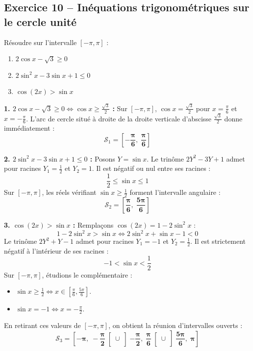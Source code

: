 \documentclass[11pt,a4paper]{article}
\begin{document}
\vspace{0.3cm}

\subsection*{Exercice 10 -- Inéquations trigonométriques sur le cercle unité}

Résoudre sur l'intervalle $[-\pi, \pi]$ :
\begin{enumerate}[label=\arabic*.]
    \item $2\cos x - \sqrt{3} \ge 0$
    \item $2\sin^2 x - 3\sin x + 1 \le 0$
    \item $\cos(2x) > \sin x$
\end{enumerate}

\begin{correctionbox}
\textbf{1. $2\cos x - \sqrt{3} \ge 0 \iff \cos x \ge \frac{\sqrt{3}}{2}$ :}
Sur $[-\pi, \pi]$, $\cos x = \frac{\sqrt{3}}{2}$ pour $x = \frac{\pi}{6}$ et $x = -\frac{\pi}{6}$.
L'arc de cercle situé à droite de la droite verticale d'abscisse $\frac{\sqrt{3}}{2}$ donne immédiatement :
\[
\mathcal{S}_1 = \mathbf{\left[ -\frac{\pi}{6}, \; \frac{\pi}{6} \right]}
\]

\textbf{2. $2\sin^2 x - 3\sin x + 1 \le 0$ :}
Posons $Y = \sin x$. Le trinôme $2Y^2 - 3Y + 1$ admet pour racines $Y_1 = \frac{1}{2}$ et $Y_2 = 1$.
Il est négatif ou nul entre ses racines :
\[
\frac{1}{2} \le \sin x \le 1
\]
Sur $[-\pi, \pi]$, les réels vérifiant $\sin x \ge \frac{1}{2}$ forment l'intervalle angulaire :
\[
\mathcal{S}_2 = \mathbf{\left[ \frac{\pi}{6}, \; \frac{5\pi}{6} \right]}
\]

\textbf{3. $\cos(2x) > \sin x$ :}
Remplaçons $\cos(2x) = 1 - 2\sin^2 x$ :
\[
1 - 2\sin^2 x > \sin x \iff 2\sin^2 x + \sin x - 1 < 0
\]
Le trinôme $2Y^2 + Y - 1$ admet pour racines $Y_1 = -1$ et $Y_2 = \frac{1}{2}$.
Il est strictement négatif à l'intérieur de ses racines :
\[
-1 < \sin x < \frac{1}{2}
\]
Sur $[-\pi, \pi]$, étudions le complémentaire :
\begin{itemize}[label=$\bullet$]
    \item $\sin x \ge \frac{1}{2} \iff x \in \left[ \frac{\pi}{6}, \frac{5\pi}{6} \right]$.
    \item $\sin x = -1 \iff x = -\frac{\pi}{2}$.
\end{itemize}
En retirant ces valeurs de $[-\pi, \pi]$, on obtient la réunion d'intervalles ouverts :
\[
\mathcal{S}_3 = \mathbf{\left[ -\pi, \; -\frac{\pi}{2} \right[ \cup \left] -\frac{\pi}{2}, \; \frac{\pi}{6} \right[ \cup \left] \frac{5\pi}{6}, \; \pi \right]}
\]
\end{correctionbox}
\end{document}
